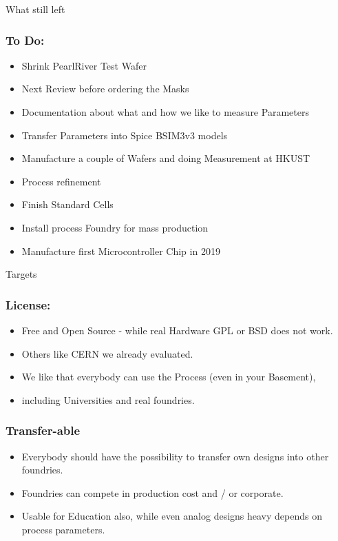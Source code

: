 \documentclass{beamer}
\begin{document}
\begin{frame}
What still left
\end{frame}

\begin{frame}
\frametitle{To Do:}
\begin{itemize}
\item Shrink PearlRiver Test Wafer
\item Next Review before ordering the Masks
\item Documentation about what and how we like to measure Parameters
\item Transfer Parameters into Spice BSIM3v3 models
\item Manufacture a couple of Wafers and doing Measurement at HKUST
\item Process refinement
\item Finish Standard Cells
\item Install process Foundry for mass production
\item Manufacture first Microcontroller Chip in 2019
\end{itemize}
\end{frame}

\begin{frame}
Targets
\end{frame}

\begin{frame}
\frametitle{License:}
\begin{itemize}
\item Free and Open Source - while real Hardware GPL or BSD does not work.
\item Others like CERN we already evaluated.
\item We like that everybody can use the Process (even in your Basement),
\item including Universities and real foundries.
\end{itemize}
\end{frame}

\begin{frame}
\frametitle{Transfer-able}
\begin{itemize}
\item Everybody should have the possibility to transfer own designs into other foundries.
\item Foundries can compete in production cost and / or corporate.
\item Usable for Education also, while even analog designs heavy depends on process parameters.
\end{itemize}
\end{frame}
\end{document}
